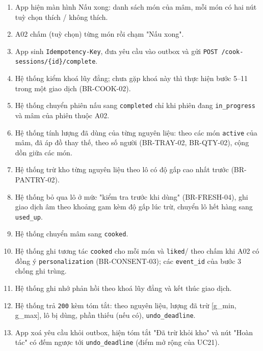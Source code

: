 \begin{enumerate}
\item App hiện màn hình Nấu xong: danh sách món của mâm, mỗi món có hai nút tuỳ chọn thích /\allowbreak{} không thích.
\item A02 chấm (tuỳ chọn) từng món rồi chạm "Nấu xong".
\item App sinh {\small\texttt{Idempotency-\allowbreak{}Key}}, đưa yêu cầu vào outbox và gửi {\small\texttt{POST /\allowbreak{}\allowbreak{}cook-\allowbreak{}sessions/\allowbreak{}\allowbreak{}\{id\}/\allowbreak{}\allowbreak{}complete}}.
\item Hệ thống kiểm khoá lũy đẳng; chưa gặp khoá này thì thực hiện bước 5--11 trong một giao dịch (BR-\allowbreak{}COOK-\allowbreak{}02).
\item Hệ thống chuyển phiên nấu sang {\small\texttt{completed}} chỉ khi phiên đang {\small\texttt{in\_\allowbreak{}\allowbreak{}progress}} và mâm của phiên thuộc A02.
\item Hệ thống tính lượng đã dùng của từng nguyên liệu: theo các món {\small\texttt{active}} của mâm, đã áp đồ thay thế, theo số người (BR-\allowbreak{}TRAY-\allowbreak{}02, BR-\allowbreak{}QTY-\allowbreak{}02), cộng dồn giữa các món.
\item Hệ thống trừ kho từng nguyên liệu theo lô có độ gấp cao nhất trước (BR-\allowbreak{}PANTRY-\allowbreak{}02).
\item Hệ thống bỏ qua lô ở mức "kiểm tra trước khi dùng" (BR-\allowbreak{}FRESH-\allowbreak{}04), ghi giao dịch âm theo khoảng gam kèm độ gấp lúc trừ, chuyển lô hết hàng sang {\small\texttt{used\_\allowbreak{}\allowbreak{}up}}.
\item Hệ thống chuyển mâm sang {\small\texttt{cooked}}.
\item Hệ thống ghi tương tác {\small\texttt{cooked}} cho mỗi món và {\small\texttt{liked}}/ theo chấm khi A02 có đồng ý {\small\texttt{personalization}} (BR-\allowbreak{}CONSENT-\allowbreak{}03); các {\small\texttt{event\_\allowbreak{}\allowbreak{}id}} của bước 3 chống ghi trùng.
\item Hệ thống ghi nhớ phản hồi theo khoá lũy đẳng và kết thúc giao dịch.
\item Hệ thống trả {\small\texttt{200}} kèm tóm tắt: theo nguyên liệu, lượng đã trừ [g\_\allowbreak{}min, g\_\allowbreak{}max], lô bị dùng, phần thiếu (nếu có), {\small\texttt{undo\_\allowbreak{}\allowbreak{}deadline}}.
\item App xoá yêu cầu khỏi outbox, hiện tóm tắt "Đã trừ khỏi kho" và nút "Hoàn tác" có đếm ngược tới {\small\texttt{undo\_\allowbreak{}\allowbreak{}deadline}} (điểm mở rộng của UC21).
\end{enumerate}
